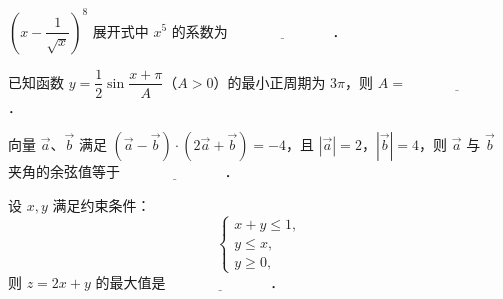 \begin{question}
$\left(x-\dfrac{1}{\sqrt{x}}\right)^8$ 展开式中 $x^5$ 的系数为 $\underline{\hspace{3cm}}$．

\end{question}
\begin{question}
已知函数 $y=\dfrac{1}{2}\sin\dfrac{x+\pi}{A}$（$A>0$）的最小正周期为 $3\pi$，则 $A=\underline{\hspace{3cm}}$．

\end{question}
\begin{question}
向量 $\vec{a}$、$\vec{b}$ 满足 $(\vec{a}-\vec{b})\cdot(2\vec{a}+\vec{b})=-4$，且 $|\vec{a}|=2$，$|\vec{b}|=4$，则 $\vec{a}$ 与 $\vec{b}$ 夹角的余弦值等于 $\underline{\hspace{3cm}}$．

\end{question}
\begin{question}
设 $x,y$ 满足约束条件：
\nopagebreak[4]
\[
\begin{cases}
x+y\leqslant 1,\\
y\leqslant x,\\
y\geqslant 0,
\end{cases}
\]
则 $z=2x+y$ 的最大值是 $\underline{\hspace{3cm}}$．

\end{question}

